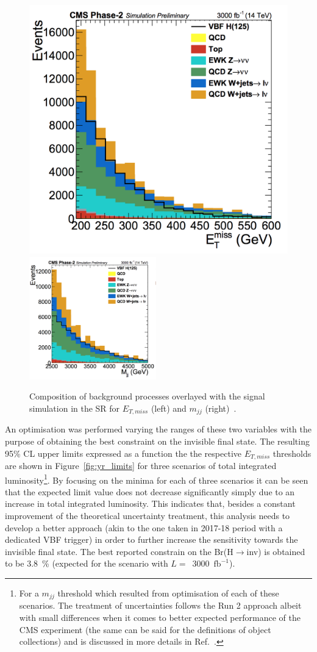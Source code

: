 \begin{figure}[htbp]
  \centering
    \includegraphics[width=0.49 \textwidth]{Conclusion/YR_MET.png}
    \includegraphics[width=0.49\textwidth]{Conclusion/YR_mjj.png}

  \caption{Composition of background processes overlayed with the signal simulation in the SR for $E_{T,miss}$ (left) and $m_{jj}$ (right)~\cite{yellow_report}.}
  \label{fig:yr_distributions}
\end{figure}
\hspace{10pt} An optimisation was performed varying the ranges of these two variables with the purpose of obtaining the best constraint on the invisible final state. The resulting 95\% CL upper limits expressed as a function the the respective $E_{T,miss}$ thresholds are shown in Figure~\ref{fig:yr_limits} for three scenarios of total integrated luminosity\footnote{For a $m_{jj}$ threshold which resulted from optimisation of each of these scenarios. The treatment of uncertainties follows the Run 2 approach albeit with small differences when it comes to better expected performance of the CMS experiment (the same can be said for the definitions of object collections) and is discussed in more details in Ref.~\cite{yellow_report}.}. By focusing on the minima for each of three scenarios it can be seen that the expected limit value does not decrease significantly simply due to an increase in total integrated luminosity. This indicates that, besides a constant improvement of the theoretical uncertainty treatment, this analysis needs to develop a better approach (akin to the one taken in 2017-18 period with a dedicated VBF trigger) in order to further increase the sensitivity towards the invisible final state. The best reported constrain on the Br(H$\rightarrow$inv) is obtained to be 3.8~\% (expected for the scenario with $L =$~3000~$\text{fb}^{-1}$).

